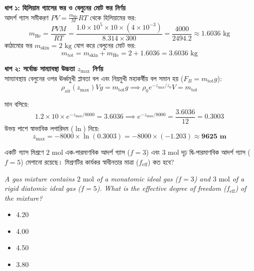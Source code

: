 \documentclass[12pt, a4paper]{article}
\begin{document}
\begin{tcolorbox}[solutionbox={সমাধান (Solution)}]
    \noindent
    \textbf{ধাপ ১: হিলিয়াম গ্যাসের ভর ও বেলুনের মোট ভর নির্ণয়} \\
    আদর্শ গ্যাস সমীকরণ $P V = \frac{m_{\text{He}}}{M} R T$ থেকে হিলিয়ামের ভর:
    \[ m_{\text{He}} = \frac{P V M}{R T} = \frac{1.0 \times 10^5 \times 10 \times (4 \times 10^{-3})}{8.314 \times 300} = \frac{4000}{2494.2} \approx 1.6036\text{ kg} \]
    কাঠামোর ভর $m_{\text{skin}} = 2\text{ kg}$ যোগ করে বেলুনের মোট ভর:
    \[ m_{\text{tot}} = m_{\text{skin}} + m_{\text{He}} = 2 + 1.6036 = 3.6036\text{ kg} \]

    \vspace{0.6em}
    \noindent\textbf{ধাপ ২: সর্বোচ্চ সাম্যাবস্থা উচ্চতা $z_{\text{max}}$ নির্ণয়} \\
    সাম্যাবস্থায় বেলুনের ওপর ঊর্ধ্বমুখী প্লাবতা বল এবং নিম্নমুখী মহাকর্ষীয় বল সমান হয় ($F_B = m_{\text{tot}} g$):
    \[ \rho_{\text{air}}(z_{\text{max}}) V g = m_{\text{tot}} g \implies \rho_0 e^{-z_{\text{max}}/z_0} V = m_{\text{tot}} \]
    
    মান বসিয়ে:
    \[ 1.2 \times 10 \times e^{-z_{\text{max}}/8000} = 3.6036 \implies e^{-z_{\text{max}}/8000} = \frac{3.6036}{12} = 0.3003 \]
    উভয় পাশে স্বাভাবিক লগারিদম ($\ln$) নিয়ে:
    \[ z_{\text{max}} = -8000 \times \ln(0.3003) = -8000 \times (-1.203) \approx \mathbf{9625\text{ m}} \]
\end{tcolorbox}
\begin{tcolorbox}[questionbox={প্রশ্ন (Question) 3}]
    \noindent
    একটি গ্যাস মিশ্রণে $2\text{ mol}$ এক-পারমাণবিক আদর্শ গ্যাস ($f = 3$) এবং $3\text{ mol}$ দৃঢ় দ্বি-পারমাণবিক আদর্শ গ্যাস ($f = 5$) মেশানো রয়েছে। মিশ্রণটির কার্যকর স্বাধীনতার মাত্রা ($f_{\text{eff}}$) কত হবে?
    
    \vspace{0.8em}
    \begin{english}
    \noindent\textit{\color{darkgray}
    A gas mixture contains $2\text{ mol}$ of a monatomic ideal gas ($f = 3$) and $3\text{ mol}$ of a rigid diatomic ideal gas ($f = 5$). What is the effective degree of freedom ($f_{\text{eff}}$) of the mixture?
    }
    \end{english}
\end{tcolorbox}

\begin{itemize}[label={}, leftmargin=1cm, itemsep=0.5em]
    \item[\textbf{A)}]  4.20
    \item[\textbf{B)}]  4.00
    \item[\textbf{C)}]  4.50
    \item[\textbf{D)}]  3.80
\end{itemize}
\end{document}
